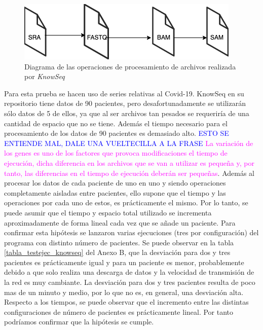 \begin{figure}[H]
    \centering
    \includegraphics[scale=0.6]{doc/assets/images/Capitulo3/process_kwnoseq.png}
    \caption{Diagrama de las operaciones de procesamiento de archivos realizada por \textit{KnowSeq}}
    \label{fig_process_knowseq}
\end{figure}



Para esta prueba se hacen uso de series relativas al Covid-19. KnowSeq en su repositorio tiene datos de 90 pacientes, pero desafortunadamente se utilizarán sólo datos de 5 de ellos, ya que al ser archivos tan pesados se requeriría de una cantidad de espacio que no se tiene. Además el tiempo necesario para el procesamiento de los datos de 90 pacientes es demasiado alto. \textcolor{blue}{ESTO SE ENTIENDE MAL, DALE UNA VUELTECILLA A LA FRASE} \textcolor{magenta}{ La variación de los genes es uno de los factores que provoca modificaciones el tiempo de ejecución, dicha diferencia en los archivos que se van a utilizar es pequeña y, por tanto, las diferencias en el tiempo de ejecución deberán ser pequeñas}. Además al procesar los datos de cada paciente de uno en uno y siendo operaciones completamente aisladas entre pacientes, ello supone que el tiempo y las operaciones por cada uno de estos, es prácticamente el mismo. Por lo tanto, se puede asumir que el tiempo y espacio total utilizado se incrementa aproximadamente de forma lineal cada vez que se añade un paciente. Para confirmar esta hipótesis se lanzaron varias ejecuciones (tres por configuración) del programa con distinto número de pacientes. Se puede observar en la tabla \ref{tabla_testejec_knowseq} del Anexo B, que la desviación para dos y tres pacientes es prácticamente igual y para un paciente es menor, probablemente debido a que solo realiza una descarga de datos y la velocidad de transmisión de la red es muy cambiante. La desviación para dos y tres pacientes resulta de poco mas de un minuto y medio, por lo que no es, en general, una desviación alta. Respecto a los tiempos, se puede observar que el incremento entre las distintas configuraciones de número de pacientes es prácticamente lineal. Por tanto podríamos confirmar que la hipótesis se cumple. \\

